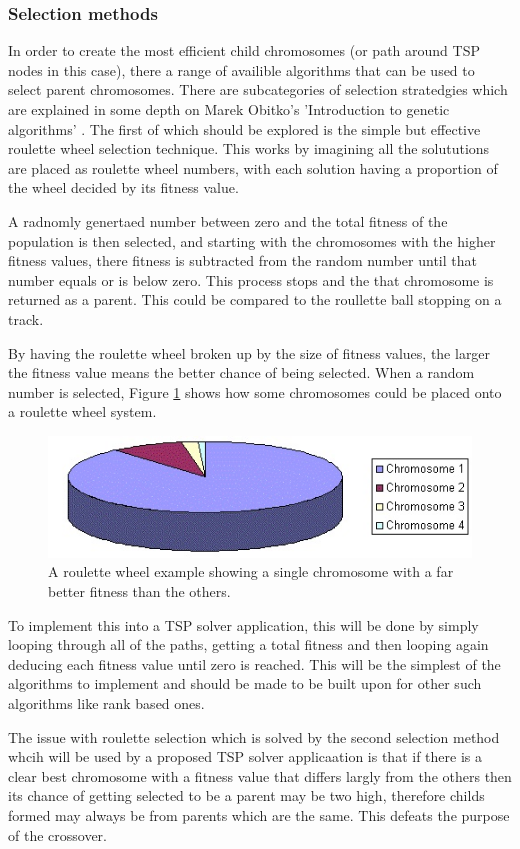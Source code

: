 \documentclass[article]{IEEEtran}
\begin{document}
\subsubsection{Selection methods}
In order to create the most efficient child chromosomes (or path around TSP nodes in this case), there a range of availible algorithms that can be used to select parent chromosomes. There are subcategories of selection stratedgies which are explained in some depth on Marek Obitko's 'Introduction to genetic algorithms' \cite{6} . The first of which should be explored is the simple but effective roulette wheel selection technique. This works by imagining all the solututions are placed as roulette wheel numbers, with each solution having a proportion of the wheel decided by its fitness value. \par
A radnomly genertaed number between zero and the total fitness of the population is then selected, and starting with the chromosomes with the higher fitness values, there fitness is subtracted from the random number until that number equals or is below zero. This process stops and the that chromosome is returned as a parent. This could be compared to the roullette ball stopping on a track. \par
By having the roulette wheel broken up by the size of fitness values, the larger the fitness value means the better chance of being selected. When a random number is selected, Figure \ref{fig:3} shows how some chromosomes could be placed onto a roulette wheel system. 
\begin{figure}[H]
\centering
  \includegraphics[width=.8\linewidth]{images/rouletteWheel}
  \caption{A roulette wheel example showing a single chromosome with a far better fitness than the others.}
  \label{fig:3}
\end{figure}
To implement this into a TSP solver application, this will be done by simply looping through all of the paths, getting a total fitness and then looping again deducing each fitness value until zero is reached. This will be the simplest of the algorithms to implement and should be made to be built upon for other such algorithms like rank based ones. \par
The issue with roulette selection which is solved by the second selection method whcih will be used by a proposed TSP solver applicaation is that if there is a clear best chromosome with a fitness value that differs largly from the others then its chance of getting selected to be a parent may be two high, therefore childs formed may always be from parents which are the same. This defeats the purpose of the crossover. \par
\end{document}
